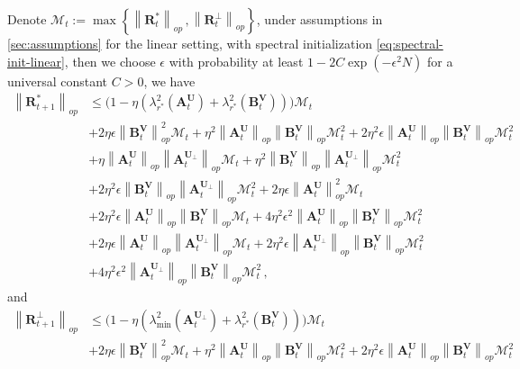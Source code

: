 \begin{lemma}
\label{mathcalMt}
    Denote $\mathcal{M}_t:=\max \left\{\left\|\bm R^*_{t}\right\|_{op}\,,\left\|\bm R^\perp_{t}\right\|_{op}\right\}$, 
under assumptions in \cref{sec:assumptions} for the linear setting, with spectral initialization \eqref{eq:spectral-init-linear}, then we choose $\epsilon$ with probability at least $1- 2C\exp(-\epsilon^2 N)$ for a universal constant $C>0$, we have 
    \begin{align*}
        \left\|\bm R^*_{t+1}\right\|_{op} & \leq \bigg(1-\eta\left(\lambda_{r^*}^2\left(\bm A_t^{\bm U}\right)+\lambda_{r^*}^2\left(\bm B_t^{\bm V}\right)\right)\bigg)\mathcal{M}_t\\
        & + 2\eta \epsilon \left\|\bm B^{\bm V}_{t}\right\|_{op}^2 \mathcal{M}_t + \eta^2 \left\|\bm A^{\bm U}_{t}\right\|_{op}\left\|\bm B^{\bm V}_{t}\right\|_{op}\mathcal{M}_t^2 + 2\eta^2 \epsilon \left\|\bm A^{\bm U}_{t}\right\|_{op}\left\|\bm B^{\bm V}_{t}\right\|_{op}\mathcal{M}_t^2\\
        & + \eta \left\|\bm A^{\bm U}_{t}\right\|_{op}\left\|\bm A^{\bm U_\perp}_{t}\right\|_{op}\mathcal{M}_t+\eta^2 \left\|\bm B^{\bm V}_{t}\right\|_{op}\left\|\bm A^{\bm U_\perp}_{t}\right\|_{op}\mathcal{M}_t^2\\
        & +2\eta^2 \epsilon \left\|\bm B^{\bm V}_{t}\right\|_{op}\left\|\bm A^{\bm U_\perp}_{t}\right\|_{op}\mathcal{M}_t^2+2\eta \epsilon \left\|\bm A^{\bm U}_{t}\right\|_{op}^2 \mathcal{M}_t\\
        & + 2 \eta^2 \epsilon \left\|\bm A^{\bm U}_{t}\right\|_{op}\left\|\bm B^{\bm V}_{t}\right\|_{op} \mathcal{M}_t + 4 \eta^2 \epsilon^2 \left\|\bm A^{\bm U}_{t}\right\|_{op}\left\|\bm B^{\bm V}_{t}\right\|_{op} \mathcal{M}_t^2\\
        & + 2 \eta \epsilon \left\|\bm A^{\bm U}_{t}\right\|_{op}\left\|\bm A^{\bm U_\perp}_{t}\right\|_{op}\mathcal{M}_t+2\eta^2 \epsilon \left\|\bm A^{\bm U_\perp}_{t}\right\|_{op}\left\|\bm B^{\bm V}_{t}\right\|_{op}\mathcal{M}_t^2\\
        & + 4 \eta^2 \epsilon^2 \left\|\bm A^{\bm U_\perp}_{t}\right\|_{op}\left\|\bm B^{\bm V}_{t}\right\|_{op} \mathcal{M}_t^2\,,
    \end{align*}
    and
    \begin{align}
        \left\|\bm R^\perp_{t+1}\right\|_{op} & \leq \bigg(1-\eta\left(\lambda_{\min}^2\left(\bm A_t^{\bm U_\perp}\right)+\lambda_{r^*}^2\left(\bm B_t^{\bm V}\right)\right)\bigg)\mathcal{M}_t\label{drop}\\
        & + 2 \eta \epsilon \left\|\bm B^{\bm V}_{t}\right\|_{op}^2 \mathcal{M}_t + \eta^2 \left\|\bm A^{\bm U}_{t}\right\|_{op}\left\|\bm B^{\bm V}_{t}\right\|_{op}\mathcal{M}_t^2 + 2\eta^2 \epsilon \left\|\bm A^{\bm U}_{t}\right\|_{op}\left\|\bm B^{\bm V}_{t}\right\|_{op}\mathcal{M}_t^2\nonumber\\

\end{align}
\end{lemma}
